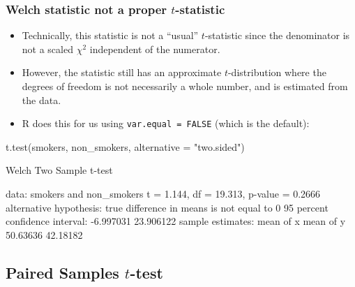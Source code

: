 \documentclass[a4paper]{article}\usepackage[]{graphicx}\usepackage[]{xcolor}
\begin{document}
\subsubsection{Welch statistic not a proper \( t \)-statistic}
\begin{itemize}
	\item Technically, this statistic is not a ``usual'' \( t \)-statistic since the denominator is not a scaled \( \chi^2 \) independent of the numerator.
	\item However, the statistic still has an approximate \( t \)-distribution where the degrees of freedom is not necessarily a whole number, and is estimated from the data.
	\item R does this for us using \lstinline|var.equal = FALSE| (which is the default):
\end{itemize}
\begin{Schunk}
\begin{Sinput}
t.test(smokers, non_smokers, alternative = "two.sided")
\end{Sinput}
\begin{Soutput}

	Welch Two Sample t-test

data:  smokers and non_smokers
t = 1.144, df = 19.313, p-value = 0.2666
alternative hypothesis: true difference in means is not equal to 0
95 percent confidence interval:
 -6.997031 23.906122
sample estimates:
mean of x mean of y 
 50.63636  42.18182 
\end{Soutput}
\end{Schunk}
\subsection{Paired Samples \( t \)-test}
\end{document}
